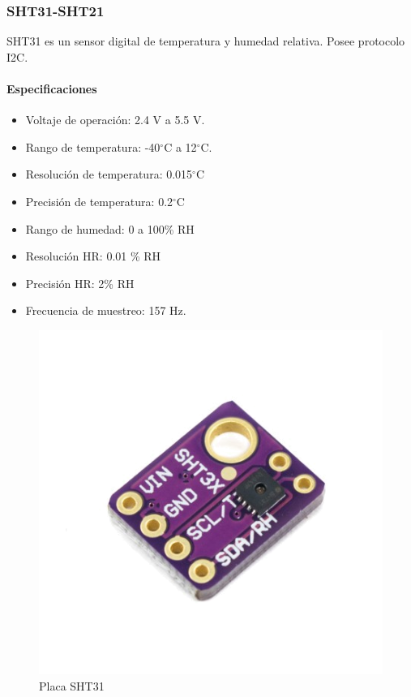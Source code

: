 \documentclass[12pt,a4paper]{article}
\newcommand{\grad}{$^{\circ}$}
\begin{document}
	\subsubsection{SHT31-SHT21}
	SHT31 es un sensor digital de temperatura y humedad relativa. Posee protocolo I2C.
	\paragraph*{Especificaciones}
	\begin{itemize}
		\item   Voltaje de operación: 2.4 V a 5.5 V.
		\item	Rango de temperatura: -40\grad C a 12\grad C.
		\item   Resolución de temperatura: 0.015\grad C
		\item	Precisión de temperatura: 0.2\grad C 
		\item	Rango de humedad: 0 a 100\% RH
		\item   Resolución HR: 0.01 \% RH
		\item   Precisión HR: 2\% RH
		\item Frecuencia de muestreo: 157 Hz.
	\end{itemize}
		\begin{figure}[htb]
	\centering
	\includegraphics[scale=0.35]{SHT31.png}
	\caption{Placa SHT31}
	\label{fig:SHT31}
		\end{figure}
	
\end{document}

